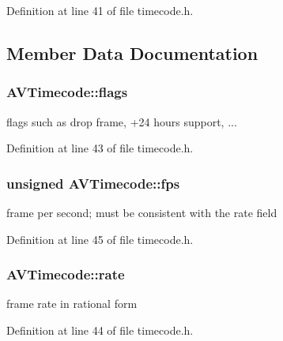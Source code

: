 Definition at line 41 of file timecode.\+h.



\subsection{Member Data Documentation}
\subsubsection[{\texorpdfstring{flags}{flags}}]{ A\+V\+Timecode\+::flags}\hypertarget{struct_a_v_timecode_a76c634043ddfaa9b5772af8286e76216}{}\label{struct_a_v_timecode_a76c634043ddfaa9b5772af8286e76216}


flags such as drop frame, +24 hours support, ... 



Definition at line 43 of file timecode.\+h.

\subsubsection[{\texorpdfstring{fps}{fps}}]{\setlength{\rightskip}{0pt plus 5cm}unsigned A\+V\+Timecode\+::fps}\hypertarget{struct_a_v_timecode_a4f51e07f80e11263ccfb5efafdab5024}{}\label{struct_a_v_timecode_a4f51e07f80e11263ccfb5efafdab5024}


frame per second; must be consistent with the rate field 



Definition at line 45 of file timecode.\+h.

\subsubsection[{\texorpdfstring{rate}{rate}}]{ A\+V\+Timecode\+::rate}\hypertarget{struct_a_v_timecode_a96510357827972576efb578725affb89}{}\label{struct_a_v_timecode_a96510357827972576efb578725affb89}


frame rate in rational form 



Definition at line 44 of file timecode.\+h.

